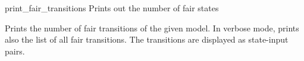 \begin{nusmvCommand}{print\_fair\_transitions} {Prints out the number of fair states}


Prints the number of fair transitions of the given model. In verbose
mode, prints also the list of all fair transitions. The transitions
are displayed as state-input pairs.

\end{nusmvCommand}
